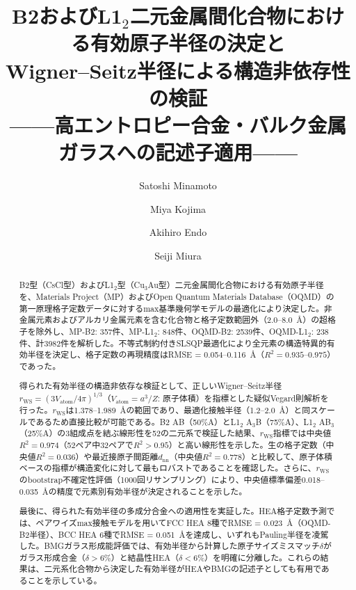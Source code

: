 \documentclass[a4paper,10pt,5p]{elsarticle}
\begin{document}
\begin{frontmatter}

\title{B2およびL1$_2$二元金属間化合物における有効原子半径の決定と\\Wigner--Seitz半径による構造非依存性の検証\\——高エントロピー合金・バルク金属ガラスへの記述子適用——}

\author[nims]{Satoshi Minamoto}
\author[nims]{Miya Kojima}  
\author[nims]{Akihiro Endo}
\author[hokudai]{Seiji Miura}


\begin{abstract}

B2型（CsCl型）およびL1$_2$型（Cu$_3$Au型）二元金属間化合物における有効原子半径を、Materials Project（MP）およびOpen Quantum Materials Database（OQMD）の第一原理格子定数データに対するmax基準幾何学モデルの最適化により決定した。非金属元素およびアルカリ金属元素を含む化合物と格子定数範囲外（2.0--8.0~\AA）の超格子を除外し、MP-B2: 357件、MP-L1$_2$: 848件、OQMD-B2: 2539件、OQMD-L1$_2$: 238件、計3982件を解析した。不等式制約付きSLSQP最適化により全元素の構造特異的有効半径を決定し、格子定数の再現精度はRMSE = 0.054--0.116~\AA（$R^2 = 0.935$--$0.975$）であった。

得られた有効半径の構造非依存な検証として、正しいWigner--Seitz半径$r_\mathrm{WS} = (3V_\mathrm{atom}/4\pi)^{1/3}$（$V_\mathrm{atom} = a^3/Z$: 原子体積）を指標とした疑似Vegard則解析を行った。$r_\mathrm{WS}$は1.378--1.989~\AA の範囲であり、最適化接触半径（1.2--2.0~\AA）と同スケールであるため直接比較が可能である。B2 AB（50\%A）とL1$_2$ A$_3$B（75\%A）、L1$_2$ AB$_3$（25\%A）の3組成点を結ぶ線形性を52の二元系で検証した結果、$r_\mathrm{WS}$指標では中央値$R^2 = 0.974$（52ペア中32ペアで$R^2 > 0.95$）と高い線形性を示した。生の格子定数（中央値$R^2 = 0.036$）や最近接原子間距離$d_\mathrm{nn}$（中央値$R^2 = 0.778$）と比較して、原子体積ベースの指標が構造変化に対して最もロバストであることを確認した。さらに、$r_\mathrm{WS}$のbootstrap不確定性評価（1000回リサンプリング）により、中央値標準偏差0.018--0.035~\AA の精度で元素別有効半径が決定されることを示した。

最後に、得られた有効半径の多成分合金への適用性を実証した。HEA格子定数予測では、ペアワイズmax接触モデルを用いてFCC HEA 8種でRMSE = 0.023~\AA（OQMD-B2半径）、BCC HEA 6種でRMSE = 0.051~\AA を達成し、いずれもPauling半径を凌駕した。BMGガラス形成能評価では、有効半径から計算した原子サイズミスマッチ$\delta$がガラス形成合金（$\delta > 6$\%）と結晶性HEA（$\delta < 6$\%）を明確に分離した。これらの結果は、二元系化合物から決定した有効半径がHEAやBMGの記述子としても有用であることを示している。


\end{abstract}
\end{frontmatter}
\end{document}
